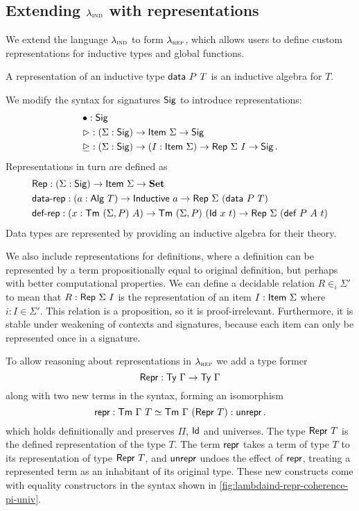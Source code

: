 \subsection{Extending $\lambda_{\textsc{ind}}$ with representations}

We extend the language $\lambda_{\textsc{ind}}$ to form $\lambda_{\textsc{rep}}$, which allows users to
define custom representations for inductive types and global functions.

\begin{definition}
	A representation of an inductive type $\textsf{data}\ P\ T$ is an inductive algebra for $T$.
\end{definition}

We modify the syntax for signatures $\textsf{Sig}$ to introduce representations:
\begin{align*}
	 & \bullet : \Sig \\
	 & \rhd : (\Sigma : \Sig) \to \Item\ \Sigma \to \Sig \\
	 & \unrhd : (\Sigma : \Sig) \to (I : \Item\ \Sigma) \to \Rep\ \Sigma\ I \to \Sig \,.
\end{align*}
Representations in turn are defined as
\begin{align*}
& \Rep : (\Sigma : \Sig) \to \Item\ \Sigma \to \Set \\
& \mta{data-rep} : (a : \mta{Alg}\ T) \to \mta{Inductive}\ a \to \Rep\ \Sigma\ (\mta{data}\ P\ T) \\
& \mta{def-rep} : (x : \Tm\ (\Sigma, P)\ A) \to \Tm\ (\Sigma, P)\ (\mta{Id}\ x\ t) \to \Rep\ \Sigma\ (\mta{def}\ P\ A\ t)
\end{align*}
Data types are represented by providing an inductive algebra for their theory.

We also include representations for definitions, where a definition can be
represented by a term propositionally equal to original definition, but perhaps
with better computational properties.
We can define a decidable relation $R \in_i \Sigma'$ to mean that $R :
\textsf{Rep}\ \Sigma\ I$ is the representation of an item $I : \textsf{Item}\ \Sigma$
where $i : I \in \Sigma'$.
This relation is a proposition, so it is proof-irrelevant. Furthermore, it is stable under
weakening of contexts and signatures, because each item can only be represented once in a signature.

To allow reasoning about representations in $\lambda_{\textsc{rep}}$ we add a type former
\begin{equation}\label{eq:repr-ty}
	\textsf{Repr}{} : \textsf{Ty}\ \Gamma \to \textsf{Ty}\ \Gamma
\end{equation}
along with two new terms in the syntax, forming an isomorphism
\begin{equation}\label{eq:repr-iso}
	\textsf{repr}{} : \textsf{Tm}\ \Gamma\ T \simeq \textsf{Tm}\ \Gamma\ (\textsf{Repr}\ T) : \textsf{unrepr}{} \,.
\end{equation}
which holds definitionally and preserves $\Pi$, $\textsf{Id}$ and universes. The
type $\MRepr\ T$ is the defined representation of the type $T$. The term
$\textsf{repr}{}$ takes a term of type $T$ to its representation of type $\MRepr\ T$,
and $\textsf{unrepr}{}$ undoes the
effect of $\textsf{repr}{}$, treating a represented term as an inhabitant of its
original type. These new constructs come with equality constructors in the syntax
shown in \cref{fig:lambdaind-repr-coherence-pi-univ}.

